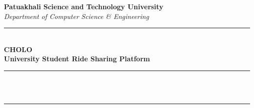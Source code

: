\documentclass[12pt,a4paper]{article}
\begin{document}
\begin{titlepage}
    \centering
    
    \vspace*{0.8cm}
    
    
    {\LARGE \textbf{Patuakhali Science and Technology University}}\\[0.4cm]
    {\large \textit{Department of Computer Science \& Engineering}}\\[2.5cm]
    
    \rule{\linewidth}{0.8mm}\\[0.5cm]
    {\huge \textbf{CHOLO}}\\[0.3cm]
    {\Large \textbf{University Student Ride Sharing Platform}}\\[0.3cm]
    \rule{\linewidth}{0.8mm}\\[1cm]
    
    \\[1cm]
    
    \rule{0.95\textwidth}{0.5pt}\\[0.1cm]
\end{titlepage}
\end{document}
